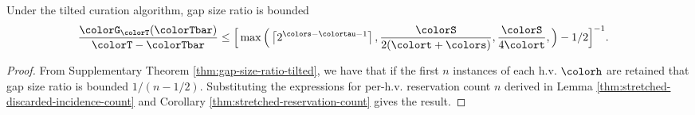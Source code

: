 \begin{theorem}
\label{thm:tilted-gap-size}
Under the tilted curation algorithm, gap size ratio is bounded
\begin{align*}
  \frac{\colorG_{\colorT}(\colorTbar)}{\colorT - \colorTbar}
  &\leq
  \Big[
    \max\Big(
      \left\lceil 2^{\colors - \colortau - 1} \right\rceil,
      \frac{\colorS}{2(\colort + \colors)},
      \frac{\colorS}{4\colort},
    \Big)
    - 1/2
  \Big]^{-1}.
\end{align*}
\end{theorem}
\begin{proof}

From Supplementary Theorem \ref{thm:gap-size-ratio-tilted}, we have that if the first $n$ instances of each h.v. $\colorh$ are retained that gap size ratio is bounded $1/(n - 1/2)$.
Substituting the expressions for per-h.v. reservation count $n$ derived in Lemma \ref{thm:stretched-discarded-incidence-count} and Corollary \ref{thm:stretched-reservation-count} gives the result.
\end{proof}
